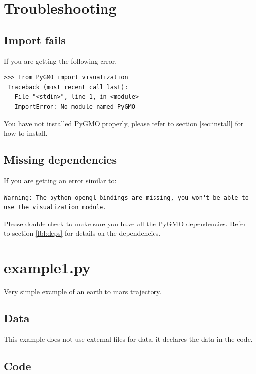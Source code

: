 \documentclass[a4paper,11pt]{article}
\begin{document}


\section{Troubleshooting}\label{sec:troubleshoot}

\subsection{Import fails}

If you are getting the following error.

\begin{lstlisting}
>>> from PyGMO import visualization
 Traceback (most recent call last):
   File "<stdin>", line 1, in <module>
   ImportError: No module named PyGMO
\end{lstlisting}

You have not installed PyGMO properly, please refer to section \ref{sec:install} for how to install.


\subsection{Missing dependencies}

If you are getting an error similar to:

\begin{lstlisting}
Warning: The python-opengl bindings are missing, you won't be able to use the visualization module.
\end{lstlisting}

Please double check to make sure you have all the PyGMO dependencies. Refer to section \ref{lbl:deps} for details on the dependencies.


\appendix

\newpage
\section{example1.py}\label{app:example1}
Very simple example of an earth to mars trajectory.
\subsection{Data}
This example does not use external files for data, it declares the data in the code.
\subsection{Code}

\end{document}
